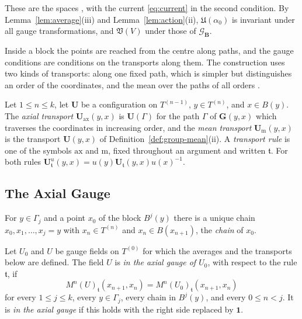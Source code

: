 \documentclass[11pt]{preprint}
\newcommand{\id}{\mathbf 1}
\numberwithin{equation}{section}
\begin{document}
These are the spaces \cite[(1.7)--(1.14), pp.~77--78]{BalabanREG}, with the current \eqref{eq:current} in the second condition. By Lemma~\ref{lem:average}(iii) and Lemma~\ref{lem:action}(ii), $\mathfrak U(\alpha_0)$ is invariant under all gauge transformations, and $\mathfrak V(V)$ under those of $\mathcal G_{\mathbf B}$.

Inside a block the points are reached from the centre along paths, and the gauge conditions are conditions on the transports along them. The construction uses two kinds of transports: along one fixed path, which is simpler but distinguishes an order of the coordinates, and the mean over the paths of all orders \cite[p.~253]{BalabanRG1}.

\begin{definition}\label{def:transports}
Let $1 \leqslant n \leqslant k$, let $\mathbf U$ be a configuration on $T^{(n-1)}$, $y \in T^{(n)}$, and $x \in B(y)$. The \emph{axial transport} $\mathbf U_{\mathrm{ax}}(y, x)$ is $\mathbf U(\Gamma)$ for the path $\Gamma$ of $\mathbf G(y, x)$ which traverses the coordinates in increasing order, and the \emph{mean transport} $\mathbf U_{\mathrm m}(y, x)$ is the transport $\mathbf U(y, x)$ of Definition~\ref{def:group-mean}(ii). A \emph{transport rule} is one of the symbols $\mathrm{ax}$ and $\mathrm m$, fixed throughout an argument and written $\mathfrak t$. For both rules $\mathbf U^u_{\mathfrak t}(y, x) = u(y)\mathbf U_{\mathfrak t}(y, x)u(x)^{-1}$.
\end{definition}

\subsection{The Axial Gauge}\label{sec:axial-gauge}

For $y \in \Gamma_j$ and a point $x_0$ of the block $B^j(y)$ there is a unique chain $x_0, x_1, \dots, x_j = y$ with $x_n \in T^{(n)}$ and $x_n \in B(x_{n+1})$, the \emph{chain} of $x_0$.

\begin{definition}\label{def:axial-gauge}
Let $U_0$ and $U$ be gauge fields on $T^{(0)}$ for which the averages and the transports below are defined. The field $U$ is \emph{in the axial gauge of $U_0$}, with respect to the rule $\mathfrak t$, if
\begin{equation}\label{eq:axial-gauge}
    M^n(U)_{\mathfrak t}(x_{n+1}, x_n) = M^n(U_0)_{\mathfrak t}(x_{n+1}, x_n)
\end{equation}
for every $1 \leqslant j \leqslant k$, every $y \in \Gamma_j$, every chain in $B^j(y)$, and every $0 \leqslant n < j$. It is \emph{in the axial gauge} if this holds with the right side replaced by $\id$.
\end{definition}
\end{document}
